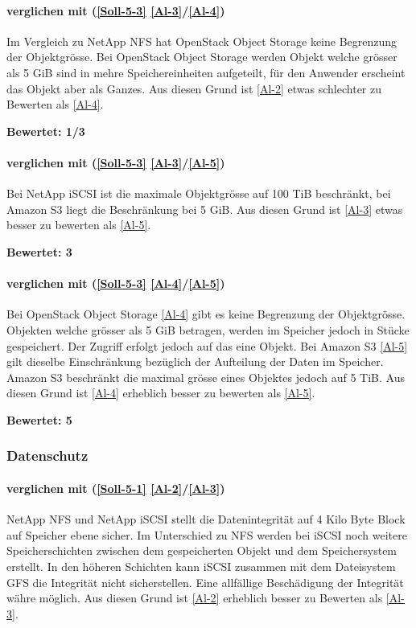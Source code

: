 \paragraph*{  verglichen mit  (\ref{Soll-5-3} \ref{Al-3}/\ref{Al-4})}
Im Vergleich zu NetApp NFS hat OpenStack Object Storage keine Begrenzung der Objektgrösse. Bei OpenStack Object Storage werden Objekt welche grösser als 5 GiB sind in mehre Speichereinheiten aufgeteilt, für den Anwender erscheint das Objekt aber als Ganzes. Aus diesen Grund ist  \ref{Al-2} etwas schlechter zu Bewerten als  \ref{Al-4}.

\textbf{Bewertet: 1/3}

\paragraph*{  verglichen mit  (\ref{Soll-5-3} \ref{Al-3}/\ref{Al-5})}
Bei NetApp iSCSI ist die maximale Objektgrösse auf 100 TiB beschränkt, bei Amazon S3 liegt die Beschränkung bei 5 GiB. Aus diesen Grund ist  \ref{Al-3} etwas besser zu bewerten als  \ref{Al-5}.

\textbf{Bewertet: 3}


\paragraph*{  verglichen mit  (\ref{Soll-5-3} \ref{Al-4}/\ref{Al-5})}
Bei OpenStack Object Storage \ref{Al-4} gibt es keine Begrenzung der Objektgrösse. Objekten welche grösser als 5 GiB betragen, werden im Speicher jedoch in Stücke gespeichert. Der Zugriff erfolgt jedoch auf das eine Objekt. Bei Amazon S3 \ref{Al-5} gilt dieselbe Einschränkung bezüglich der Aufteilung der Daten im Speicher. Amazon S3 beschränkt die maximal grösse eines Objektes jedoch auf 5 TiB. Aus diesen Grund ist \ref{Al-4} erheblich besser zu bewerten als \ref{Al-5}.

\textbf{Bewertet: 5}


\subsubsection{Datenschutz}

\paragraph*{  verglichen mit  (\ref{Soll-5-1} \ref{Al-2}/\ref{Al-3})}
NetApp NFS und NetApp iSCSI stellt die Datenintegrität auf 4 Kilo Byte Block auf Speicher ebene sicher. Im Unterschied zu NFS werden bei iSCSI noch weitere Speicherschichten zwischen dem gespeicherten Objekt und dem Speichersystem erstellt. In den höheren Schichten kann iSCSI zusammen mit dem Dateisystem GFS die Integrität nicht sicherstellen. Eine allfällige Beschädigung der Integrität währe möglich. Aus diesen Grund ist  \ref{Al-2} erheblich besser zu Bewerten als  \ref{Al-3}.

